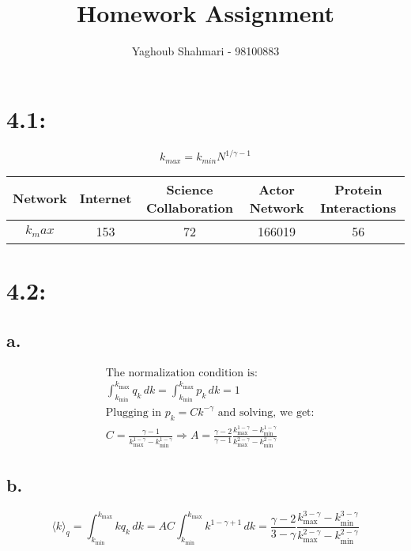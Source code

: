 \documentclass{article}
\begin{document}
\title{Homework Assignment}
\author{Yaghoub Shahmari - 98100883}
\date{}
\maketitle

\section*{4.1:}

$$k_{max} = k_{min} N^{1/\gamma - 1}$$

\begin{center}
    \begin{tabular}{ |c|c|c|c|c| }
        \hline
        Network & Internet & Science Collaboration & Actor Network & Protein Interactions \\
        \hline
        $k_max$ & 153 & 72 & 166019 & 56 \\
        \hline
    \end{tabular}
\end{center}

\section*{4.2:}

\subsection*{a.}

\begin{align*}
& \text{The normalization condition is:} \\
& \int_{k_{\min}}^{k_{\max}} q_k \,dk = \int_{k_{\min}}^{k_{\max}} p_k \, dk = 1 \\
& \text{Plugging in } p_k = C k^{-\gamma} \text{ and solving, we get:} \\  
& C = \frac{\gamma - 1}{k_{\max}^{1-\gamma} - k_{\min}^{1-\gamma}} \Rightarrow A = \frac{\gamma - 2}{\gamma - 1}\frac{k_{\max}^{1-\gamma} - k_{\min}^{1-\gamma}}{k_{\max}^{2-\gamma} - k_{\min}^{2-\gamma}}
\end{align*}

\subsection*{b.}

$$\langle k \rangle_q = \int_{k_{\min}}^{k_{\max}} k q_k \, dk = A C \int_{k_{\min}}^{k_{\max}} k^{1-\gamma+1} \, dk = \frac{\gamma - 2}{3 - \gamma} \frac{k_{\max}^{3-\gamma} - k_{\min}^{3-\gamma}}{k_{\max}^{2-\gamma} - k_{\min}^{2-\gamma}}$$
\end{document}
